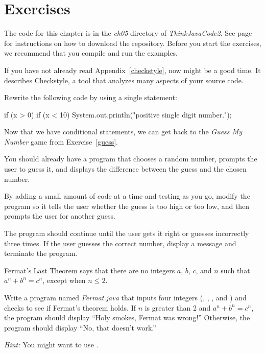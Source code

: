 \section{Exercises}

The code for this chapter is in the {\it ch05} directory of {\it ThinkJavaCode2}.
See page~\pageref{code} for instructions on how to download the repository.
Before you start the exercises, we recommend that you compile and run the examples.

If you have not already read Appendix~\ref{checkstyle}, now might be a good time.
It describes Checkstyle, a tool that analyzes many aspects of your source code.


\begin{exercise}  %

Rewrite the following code by using a single  statement:

\begin{code}
if (x > 0) {
    if (x < 10) {
        System.out.println("positive single digit number.");
    }
}
\end{code}

\end{exercise}


\begin{exercise}  %

Now that we have conditional statements, we can get back to the {\it Guess My Number} game from Exercise~\ref{guess}.

You should already have a program that chooses a random number, prompts the user to guess it, and displays the difference between the guess and the chosen number.

By adding a small amount of code at a time and testing as you go, modify the program so it tells the user whether the guess is too high or too low, and then prompts the user for another guess.

The program should continue until the user gets it right or guesses incorrectly three times.
If the user guesses the correct number, display a message and terminate the program.

\end{exercise}


\begin{exercise}  %

Fermat's Last Theorem says that there are no integers $a$, $b$, $c$, and $n$ such that $a^n + b^n = c^n$, except when $n \leq 2$.

Write a program named {\it Fermat.java} that inputs four integers (, , , and ) and checks to see if Fermat's theorem holds.
If $n$ is greater than 2 and $a^n + b^n = c^n$, the program should display ``Holy smokes, Fermat was wrong!''
Otherwise, the program should display ``No, that doesn't work.''

{\em Hint:} You might want to use .

\end{exercise}


